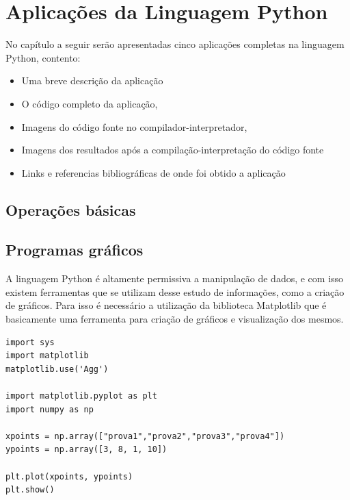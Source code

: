 


\chapter{ Aplica\c{c}\~{o}es da Linguagem Python}

No capítulo a seguir serão apresentadas cinco aplica\c{c}\~{o}es completas na linguagem Python, contento:
\begin{itemize}
  \item Uma breve descri\c{c}\~{a}o da aplica\c{c}\~{a}o
  \item O c\'{o}digo completo da aplica\c{c}\~{a}o,
  \item Imagens do c\'{o}digo fonte no compilador-interpretador,
  \item Imagens dos resultados ap\'{o}s a compila\c{c}\~{a}o-interpreta\c{c}\~{a}o do c\'{o}digo fonte
  \item Links e referencias bibliogr\'{a}ficas de onde foi obtido a aplica\c{c}\~{a}o
\end{itemize}




    \section{Opera\c{c}\~{o}es b\'{a}sicas}


    \section{Programas gr\'{a}ficos}
A linguagem Python é altamente permissiva a manipulação de dados, e com isso existem ferramentas que se utilizam desse estudo de informações, como a criação de gráficos. Para isso é necessário a utilização da biblioteca Matplotlib que é basicamente uma ferramenta para criação de gráficos e visualização dos mesmos.

\begin{lstlisting}
import sys
import matplotlib
matplotlib.use('Agg')

import matplotlib.pyplot as plt
import numpy as np

xpoints = np.array(["prova1","prova2","prova3","prova4"])
ypoints = np.array([3, 8, 1, 10])

plt.plot(xpoints, ypoints)
plt.show()
	
\end{lstlisting}
  
